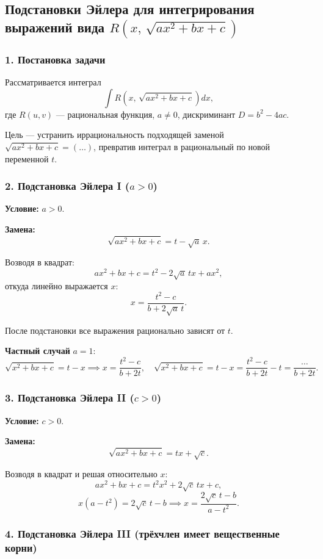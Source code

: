 \subsection{Подстановки Эйлера для интегрирования выражений вида $R\!\left(x,\,\sqrt{ax^2+bx+c}\right)$}

\subsubsection*{1. Постановка задачи}

Рассматривается интеграл
\[
\int R\!\left(x,\,\sqrt{ax^2+bx+c}\right)dx,
\]
где $R(u,v)$ — рациональная функция, $a \neq 0$, дискриминант $D = b^2 - 4ac$.

Цель — устранить иррациональность подходящей заменой $\sqrt{ax^2+bx+c} = (\ldots)$, превратив интеграл в рациональный по новой переменной $t$.

\subsubsection*{2. Подстановка Эйлера I ($a > 0$)}

\textbf{Условие:} $a > 0$.

\textbf{Замена:}
\[ \sqrt{ax^2+bx+c} = t - \sqrt{a}\,x. \]

Возводя в квадрат:
\[
ax^2+bx+c = t^2 - 2\sqrt{a}\,tx + ax^2,
\]
откуда линейно выражается $x$:
\[
x = \frac{t^2 - c}{b + 2\sqrt{a}\,t}.
\]

После подстановки все выражения рационально зависят от $t$.

\textbf{Частный случай} $a = 1$:
\[
\sqrt{x^2+bx+c} = t - x \implies x = \frac{t^2-c}{b+2t}, \quad
\sqrt{x^2+bx+c} = t - x = \frac{t^2-c}{b+2t} - t = \frac{\ldots}{b+2t}.
\]

\subsubsection*{3. Подстановка Эйлера II ($c > 0$)}

\textbf{Условие:} $c > 0$.

\textbf{Замена:}
\[ \sqrt{ax^2+bx+c} = tx + \sqrt{c}. \]

Возводя в квадрат и решая относительно $x$:
\[
ax^2+bx+c = t^2x^2 + 2\sqrt{c}\,tx + c,
\]
\[
x(a-t^2) = 2\sqrt{c}\,t - b \implies
x = \frac{2\sqrt{c}\,t - b}{a - t^2}.
\]

\subsubsection*{4. Подстановка Эйлера III (трёхчлен имеет вещественные корни)}

